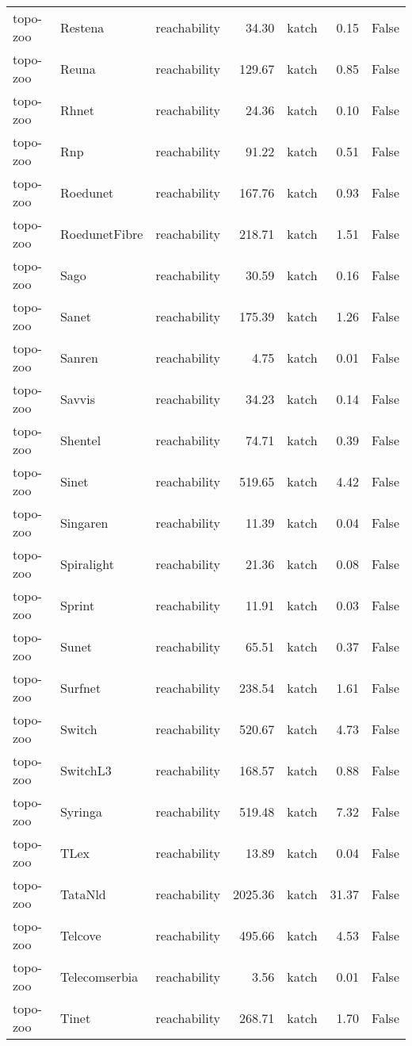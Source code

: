 \begin{tabular}{lllrlrr}
topo-zoo & Restena & reachability & 34.30 & katch & 0.15 & False \\
topo-zoo & Reuna & reachability & 129.67 & katch & 0.85 & False \\
topo-zoo & Rhnet & reachability & 24.36 & katch & 0.10 & False \\
topo-zoo & Rnp & reachability & 91.22 & katch & 0.51 & False \\
topo-zoo & Roedunet & reachability & 167.76 & katch & 0.93 & False \\
topo-zoo & RoedunetFibre & reachability & 218.71 & katch & 1.51 & False \\
topo-zoo & Sago & reachability & 30.59 & katch & 0.16 & False \\
topo-zoo & Sanet & reachability & 175.39 & katch & 1.26 & False \\
topo-zoo & Sanren & reachability & 4.75 & katch & 0.01 & False \\
topo-zoo & Savvis & reachability & 34.23 & katch & 0.14 & False \\
topo-zoo & Shentel & reachability & 74.71 & katch & 0.39 & False \\
topo-zoo & Sinet & reachability & 519.65 & katch & 4.42 & False \\
topo-zoo & Singaren & reachability & 11.39 & katch & 0.04 & False \\
topo-zoo & Spiralight & reachability & 21.36 & katch & 0.08 & False \\
topo-zoo & Sprint & reachability & 11.91 & katch & 0.03 & False \\
topo-zoo & Sunet & reachability & 65.51 & katch & 0.37 & False \\
topo-zoo & Surfnet & reachability & 238.54 & katch & 1.61 & False \\
topo-zoo & Switch & reachability & 520.67 & katch & 4.73 & False \\
topo-zoo & SwitchL3 & reachability & 168.57 & katch & 0.88 & False \\
topo-zoo & Syringa & reachability & 519.48 & katch & 7.32 & False \\
topo-zoo & TLex & reachability & 13.89 & katch & 0.04 & False \\
topo-zoo & TataNld & reachability & 2025.36 & katch & 31.37 & False \\
topo-zoo & Telcove & reachability & 495.66 & katch & 4.53 & False \\
topo-zoo & Telecomserbia & reachability & 3.56 & katch & 0.01 & False \\
topo-zoo & Tinet & reachability & 268.71 & katch & 1.70 & False \\

\end{tabular}
